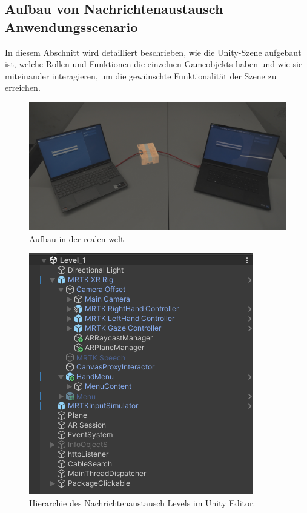 \subsection{Aufbau von Nachrichtenaustausch Anwendungsscenario}
In diesem Abschnitt wird detailliert beschrieben, wie die Unity-Szene aufgebaut ist, welche Rollen und Funktionen die einzelnen Gameobjekts haben und wie sie miteinander interagieren, um die gewünschte Funktionalität der Szene zu erreichen.
\begin{figure}[H]
    \centering
    \includegraphics[width=1\linewidth]{images/AufbauAnzeige.png}
    \caption{Aufbau in der realen welt}
    \label{fig:NachrichtenaustauschAufbau}
\end{figure}
\begin{figure}[H]
    \centering
    \includegraphics[scale=1]{images/Level1Hierarchy.png}
    \caption{Hierarchie des Nachrichtenaustausch Levels im Unity Editor.}
    \label{fig:level1Hierarchy}
\end{figure}
